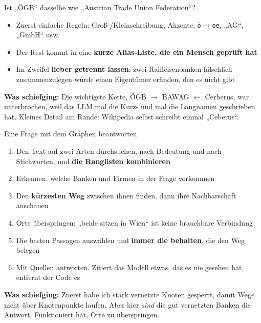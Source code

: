 \documentclass[aspectratio=169,11pt]{beamer}
\newcommand{\hl}[1]{\textcolor{midblue}{\textbf{#1}}}
\newcommand{\story}[1]{\par\vspace{6pt}\small\textcolor{softred}{\textbf{Was schiefging:}} #1}
\begin{document}
\begin{frame}{Ist „ÖGB“ dasselbe wie „Austrian Trade Union Federation“?}
  \begin{itemize}
    \item Zuerst einfache Regeln: Groß-/Kleinschreibung, Akzente, \texttt{\"o}$\rightarrow$\texttt{oe}, „AG“, „GmbH“ usw.
    \item Der Rest kommt in eine \hl{kurze Alias-Liste, die ein Mensch geprüft hat}
    \item Im Zweifel \hl{lieber getrennt lassen}: zwei Raiffeisenbanken fälschlich zusammenzulegen
          würde einen Eigentümer erfinden, den es nicht gibt
  \end{itemize}
  \story{Die wichtigste Kette, ÖGB $\rightarrow$ BAWAG $\leftarrow$ Cerberus, war unterbrochen,
    weil das LLM mal die Kurz- und mal die Langnamen geschrieben hat.
    Kleines Detail am Rande: Wikipedia selbst schreibt einmal „Ceberus“.}
\end{frame}

\begin{frame}{Eine Frage mit dem Graphen beantworten}
  \begin{enumerate}
    \item Den Text auf zwei Arten durchsuchen, nach Bedeutung und nach Stichworten, und
          \hl{die Ranglisten kombinieren}
    \item Erkennen, welche Banken und Firmen in der Frage vorkommen
    \item Den \hl{kürzesten Weg} zwischen ihnen finden, dann ihre Nachbarschaft anschauen
    \item Orte überspringen: „beide sitzen in Wien“ ist keine brauchbare Verbindung
    \item Die besten Passagen auswählen und \hl{immer die behalten}, die den Weg belegen
    \item Mit Quellen antworten. Zitiert das Modell etwas, das es nie gesehen hat, entfernt der Code es
  \end{enumerate}
  \story{Zuerst habe ich stark vernetzte Knoten gesperrt, damit Wege nicht über Knotenpunkte laufen.
    Aber hier \emph{sind} die gut vernetzten Banken die Antwort. Funktioniert hat, Orte zu überspringen.}
\end{frame}
\end{document}
